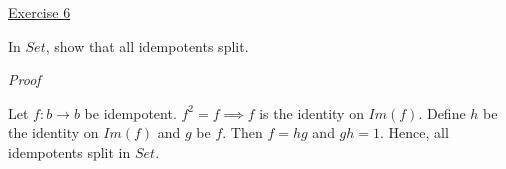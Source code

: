\noindent
\underline{Exercise 6}
\vspace{2mm}

In $Set$, show that all idempotents split.

\vspace{2mm}

\noindent
\emph{Proof}

Let $f : b \to b$ be idempotent. $f^2 = f \implies f$ is the identity on $Im(f)$. Define $h$ be the identity on $Im(f)$ and $g$ be $f$. Then $f = hg$ and $gh = 1$. Hence, all idempotents split in $Set$.

\vspace{2mm}
